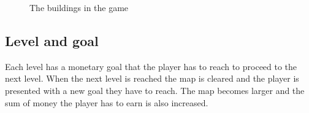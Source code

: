     \begin{figure}[!ht]
    \centering

    \caption{The buildings in the game}
    \end{figure}

\subsection*{Level and goal}
    Each level has a monetary goal that the player has to reach to proceed to the next level. When 
    the next level is reached the map is cleared and the player is presented with a new goal they 
    have to reach. The map becomes larger and the sum of money the player has to earn is also increased.